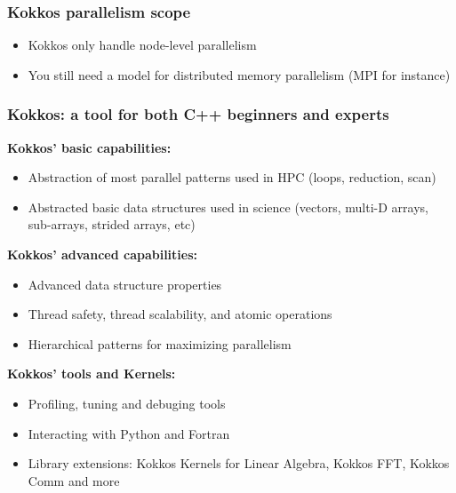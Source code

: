 \documentclass[aspectratio=169]{beamer}
\begin{document}

\begin{frame}
    \frametitle{Kokkos parallelism scope}

    \begin{itemize}
        \item Kokkos only handle node-level parallelism
        \item You still need a model for distributed memory parallelism (MPI for instance)
    \end{itemize}


\end{frame}


\begin{frame}
    \frametitle{Kokkos: a tool for both C++ beginners and experts} 
    \textbf{Kokkos' basic capabilities:}
    \begin{itemize}
        \item Abstraction of most parallel patterns used in HPC (loops, reduction, scan)
        \item Abstracted basic data structures used in science (vectors, multi-D arrays, sub-arrays, strided arrays, etc)
    \end{itemize}
    \textbf{Kokkos' advanced capabilities:}
    \begin{itemize}
        \item Advanced data structure properties
        \item Thread safety, thread scalability, and atomic operations
        \item Hierarchical patterns for maximizing parallelism 
    \end{itemize}
    \textbf{Kokkos' tools and Kernels:}
    \begin{itemize}
        \item Profiling, tuning and debuging tools
        \item Interacting with Python and Fortran
        \item Library extensions: Kokkos Kernels for Linear Algebra, Kokkos FFT, Kokkos Comm and more 
    \end{itemize}
\end{frame}

\end{document}
